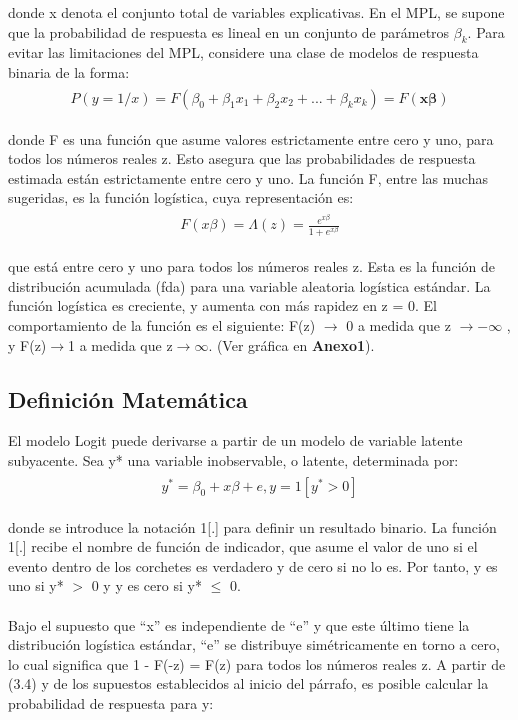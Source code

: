 \documentclass[11pt,fleqn]{book} %
\numberwithin{equation}{section} %
\numberwithin{figure}{section} %
\numberwithin{table}{section} %
\begin{document}
donde x denota el conjunto total de variables explicativas. En el MPL, se supone que la probabilidad de respuesta es lineal en un conjunto de parámetros $\beta _{k}$. Para evitar las limitaciones del MPL, considere una clase de modelos de respuesta binaria de la forma:
\begin{align} 
\begin{split}
P(y=1/x)=F(\beta _{0}+\beta _{1}x_{1}+\beta _{2}x_{2}+...+\beta _{k}x_{k})=F(\boldsymbol{x\beta})
\end{split}					
\end{align}

donde F es una función que asume valores estrictamente entre cero y uno, para todos los números reales z. Esto asegura que las probabilidades de respuesta estimada están estrictamente entre cero y uno. La función F, entre las muchas sugeridas, es la función logística, cuya representación es:
\begin{align} 
\begin{split}
F(x\beta)=\Lambda(z)=\frac{e^{x\beta}}{1+e^{x\beta}}
\end{split}					
\end{align}

que está entre cero y uno para todos los números reales z. Esta es la función de distribución acumulada (fda) para una variable aleatoria logística estándar. La función logística es creciente, y aumenta con más rapidez en z = 0. El comportamiento de la función es el siguiente: F(z) $\rightarrow $ 0 a medida que z $\rightarrow -\infty $ , y F(z)$\rightarrow $1 a medida que z$\rightarrow \infty$. (Ver gráfica en \textbf{Anexo1}).

\subsection{Definición Matemática}

El modelo Logit puede derivarse a partir de un modelo de variable latente subyacente. Sea y* una variable inobservable, o latente, determinada por:
\begin{align} 
\begin{split}
y^{*}=\beta_{0}+x\beta+e,y=1[y^{*}>0]
\end{split}					
\end{align}

donde se introduce la notación 1[.] para definir un resultado binario. La función 1[.] recibe el nombre de función de indicador, que asume el valor de uno si el evento dentro de los corchetes es verdadero y de cero si no lo es. Por tanto, y es uno si y* $>$ 0 y y es cero si y* $\leq$ 0.
\\\\
Bajo el supuesto que ``x'' es independiente de ``e'' y que este último tiene la distribución logística estándar, ``e'' se distribuye simétricamente en torno a cero, lo cual significa que 1 - F(-z) = F(z) para todos los números reales z. A partir de (3.4) y de los supuestos establecidos al inicio del párrafo, es posible calcular la probabilidad de respuesta para y:
\end{document}
